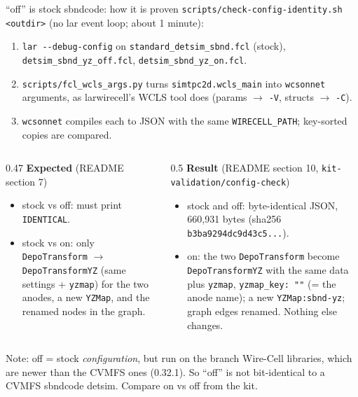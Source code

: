 \documentclass[aspectratio=169,10pt]{beamer}
\newcommand{\code}[1]{\texttt{#1}}
\begin{document}
\begin{frame}[fragile]{``off'' is stock sbndcode: how it is proven}
\small
\code{scripts/check-config-identity.sh <outdir>} (no lar event loop; about 1 minute):
\begin{enumerate}
\item \code{lar -{}-debug-config} on \code{standard\_detsim\_sbnd.fcl} (stock), \code{detsim\_sbnd\_yz\_off.fcl}, \code{detsim\_sbnd\_yz\_on.fcl}.
\item \code{scripts/fcl\_wcls\_args.py} turns \code{simtpc2d.wcls\_main} into \code{wcsonnet} arguments, as larwirecell's WCLS tool does (params $\to$ \code{-V}, structs $\to$ \code{-C}).
\item \code{wcsonnet} compiles each to JSON with the same \code{WIRECELL\_PATH}; key-sorted copies are compared.
\end{enumerate}
\vspace{1mm}
\begin{columns}[T]
\begin{column}{0.47\textwidth}
\textbf{Expected} (README section 7)
\begin{itemize}
\item stock vs off: must print \code{IDENTICAL}.
\item stock vs on: only \code{DepoTransform} $\to$ \code{DepoTransformYZ} (same settings + \code{yzmap}) for the two anodes, a new \code{YZMap}, and the renamed nodes in the graph.
\end{itemize}
\end{column}
\begin{column}{0.5\textwidth}
\textbf{Result} (README section 10, \code{kit-validation/config-check})
\begin{itemize}
\item stock and off: byte-identical JSON, 660,931 bytes (sha256 \code{b3ba9294dc9d43c5...}).
\item on: the two \code{DepoTransform} become \code{DepoTransformYZ} with the same data plus \code{yzmap}, \code{yzmap\_key: ""} (= the anode name); a new \code{YZMap:sbnd-yz}; graph edges renamed. Nothing else changes.
\end{itemize}
\end{column}
\end{columns}
\vspace{2mm}
\footnotesize\color{black!70}
Note: off = stock \emph{configuration}, but run on the branch Wire-Cell libraries, which are newer than the CVMFS ones (0.32.1). So ``off'' is not bit-identical to a CVMFS sbndcode detsim. Compare on vs off from the kit.
\end{frame}
\end{document}
